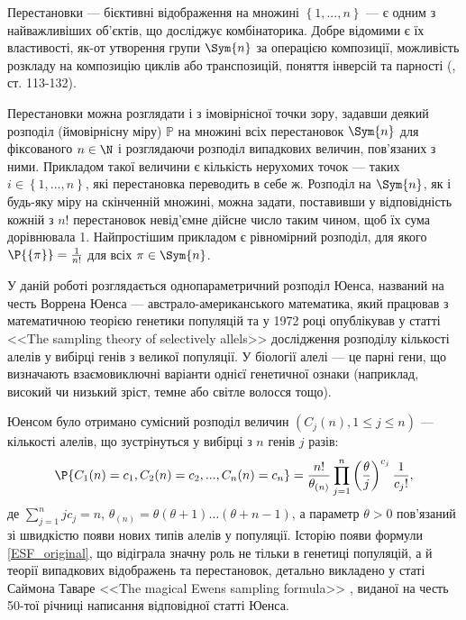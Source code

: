 Перестановки --- бієктивні відображення на множині
$\left\{1, ..., n\right\}$ --- є одним з найважливіших об'єктів, 
що досліджує комбінаторика.
Добре відомими є їх властивості, як-от
утворення групи $\Sym{n}$ за операцією композиції, можливість розкладу 
на композицію циклів або транспозицій, поняття інверсій та парності (\cite{Spectorsky}, ст. 113-132).

Перестановки можна розглядати і з імовірнісної точки зору,
задавши деякий розподіл (ймовірнісну міру) $\mathbb{P}$ на множині всіх
перестановок $\Sym{n}$ для фіксованого $n \in \N$ і розглядаючи
розподіл випадкових величин, пов'язаних з ними. Прикладом такої
величини є кількість нерухомих точок --- таких 
$i \in \left\{1,...,n\right\}$, які перестановка переводить в себе ж.
Розподіл на $\Sym{n}$, як і будь-яку міру на скінченній множині,
можна задати, поставивши у відповідність кожній з $n!$ перестановок
невід'ємне дійсне число таким чином, щоб їх сума дорівнювала 1.
Найпростішим прикладом є рівномірний розподіл, для якого
$\P{\left\{ \pi \right\}} = \frac{1}{n!}$ для всіх $\pi \in \Sym{n}$.

У даній роботі розглядається однопараметричний розподіл Юенса, 
названий на честь Воррена Юенса --- австрало-американського математика,
який працював з математичною теорією генетики популяцій 
та у 1972 році опублікував у статті <<The sampling theory of selectively allels>> \cite{EWENS197287}
дослідження розподілу кількості алелів у вибірці генів з великої популяції.
У біології алелі --- це парні гени, що визначають взаємовиключні варіанти
однієї генетичної ознаки (наприклад, високий чи низький зріст, темне або світле волосся тощо).

Юенсом було отримано сумісний розподіл величин 
$\left(C_j(n), 1 \leq j \leq n\right)$ ---
кількості алелів, що зустрінуться у вибірці з $n$ генів $j$ разів:
\begin{gather}\label{ESF_original}
    \P{
        C_1(n) = c_1, C_2(n) = c_2, ..., C_n(n) = c_n
    } = 
    \frac{n!}{\theta_{(n)}} 
    \prod_{j=1}^n \left(\frac{\theta}{j}\right)^{c_j} \frac{1}{c_j!},
\end{gather}
де $\sum_{j=1}^n j c_j = n$, $\theta_{(n)} = \theta (\theta + 1) \dots (\theta + n - 1)$,
а параметр $\theta > 0$ пов'язаний зі швидкістю появи нових типів алелів у популяції.
Історію появи формули \eqref{ESF_original}, що відіграла значну роль не тільки
в генетиці популяцій, а й теорії випадкових відображень та перестановок,
детально викладено у статі Саймона Таваре <<The magical Ewens sampling formula>> \cite{Tavare},
виданої на честь 50-тої річниці написання відповідної статті Юенса.

